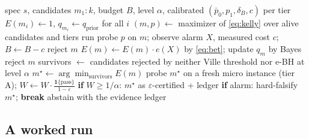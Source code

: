 \documentclass[pdflatex,sn-mathphys-num]{sn-jnl}
\theoremstyle{thmstyleone}
\theoremstyle{thmstyletwo}
\newcommand{\Eproc}{E}
\begin{document}
\begin{algorithm}[t]
\caption{ECLAIR}\label{alg:eclair}
\begin{algorithmic}[1]
\Require spec $s$, candidates $m_1{:}k$, budget $B$, level $\alpha$,
         calibrated $(\bar p_0, p_1, \delta_B, c)$ per tier
\State $\Eproc(m_i) \gets 1$, $q_{m_i} \gets q_{\mathrm{prior}}$ for all $i$
  \State $(m, p) \gets$ maximizer of \eqref{eq:kelly} over alive
         candidates and tiers
  \State run probe $p$ on $m$; observe alarm $X$, measured cost $c$;
         $B \gets B - c$
     reject $m$ 
  \Else
     \State $\Eproc(m) \gets \Eproc(m) \cdot e(X)$ by \eqref{eq:bet};
            update $q_m$ by Bayes
     \If{$\Eproc(m) \ge 1/\alpha$} reject $m$ \EndIf
  \EndIf
\EndWhile
\State survivors $\gets$ candidates rejected by neither Ville
       threshold nor e-BH at level $\alpha$
\State $m^\star \gets \arg\min_{\text{survivors}} \Eproc(m)$
  \State probe $m^\star$ on a fresh micro instance (tier A);
         $W \gets W \cdot \frac{\mathbf{1}\{\text{pass}\}}{1-\varepsilon}$
  \State \textbf{if} $W \ge 1/\alpha$: \Return $m^\star$ as
         $\varepsilon$-certified + ledger
  \State \textbf{if} alarm: hard-falsify $m^\star$; \textbf{break}
\EndWhile
\State \Return abstain with the evidence ledger
\end{algorithmic}
\end{algorithm}

\subsection{A worked run}\label{sec:worked}
\end{document}
